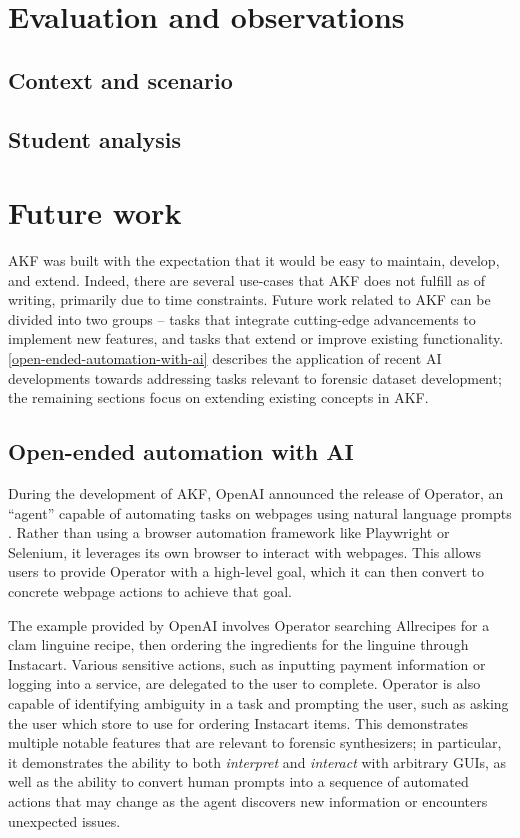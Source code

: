 \documentclass[letterpaper,12pt]{report}
\begin{document}
\chapter{Evaluation and observations}\label{chapter-seven}

\section{Context and scenario}\label{context-and-scenario}

\section{Student analysis}\label{student-analysis}

\chapter{Future work}\label{chapter-eight}

AKF was built with the expectation that it would be easy to maintain,
develop, and extend. Indeed, there are several use-cases that AKF does
not fulfill as of writing, primarily due to time constraints. Future
work related to AKF can be divided into two groups -- tasks that
integrate cutting-edge advancements to implement new features, and tasks
that extend or improve existing functionality. \autoref{open-ended-automation-with-ai} describes the application of recent AI
developments towards addressing tasks relevant to forensic dataset
development; the remaining sections focus on extending existing concepts
in AKF.

\section{Open-ended automation with
AI}\label{open-ended-automation-with-ai}

During the development of AKF, OpenAI announced the release of Operator,
an ``agent'' capable of automating tasks on webpages using natural
language prompts \cite{openaiIntroducingOperator2025}. Rather than
using a browser automation framework like Playwright or Selenium, it
leverages its own browser to interact with webpages. This allows users
to provide Operator with a high-level goal, which it can then convert to
concrete webpage actions to achieve that goal.

The example provided by OpenAI involves Operator searching Allrecipes
for a clam linguine recipe, then ordering the ingredients for the
linguine through Instacart. Various sensitive actions, such as inputting
payment information or logging into a service, are delegated to the user
to complete. Operator is also capable of identifying ambiguity in a task
and prompting the user, such as asking the user which store to use for
ordering Instacart items. This demonstrates multiple notable features
that are relevant to forensic synthesizers; in particular, it
demonstrates the ability to both \emph{interpret} and \emph{interact}
with arbitrary GUIs, as well as the ability to convert human prompts
into a sequence of automated actions that may change as the agent
discovers new information or encounters unexpected issues.
\end{document}
